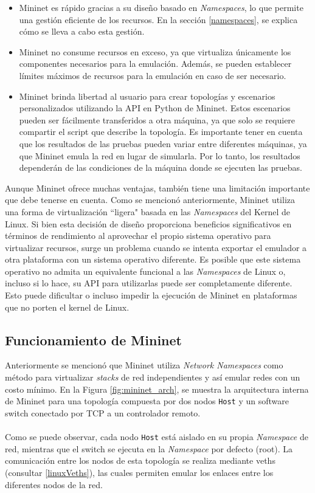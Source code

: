 \begin{itemize}
    \item Mininet es rápido gracias a su diseño basado en \textit{Namespaces}, lo que permite una gestión eficiente de los recursos. En la sección \ref{namespaces}, se explica cómo se lleva a cabo esta gestión.
    \item Mininet no consume recursos en exceso, ya que virtualiza únicamente los componentes necesarios para la emulación. Además, se pueden establecer límites máximos de recursos para la emulación en caso de ser necesario.
    \item Mininet brinda libertad al usuario para crear topologías y escenarios personalizados utilizando la API en Python de Mininet. Estos escenarios pueden ser fácilmente transferidos a otra máquina, ya que solo se requiere compartir el script que describe la topología. Es importante tener en cuenta que los resultados de las pruebas pueden variar entre diferentes máquinas, ya que Mininet emula la red en lugar de simularla. Por lo tanto, los resultados dependerán de las condiciones de la máquina donde se ejecuten las pruebas.
\end{itemize}

Aunque Mininet ofrece muchas ventajas, también tiene una limitación importante que debe tenerse en cuenta. Como se mencionó anteriormente, Mininet utiliza una forma de virtualización ``ligera" basada en las \textit{Namespaces} del Kernel de Linux. Si bien esta decisión de diseño proporciona beneficios significativos en términos de rendimiento al aprovechar el propio sistema operativo para virtualizar recursos, surge un problema cuando se intenta exportar el emulador a otra plataforma con un sistema operativo diferente. Es posible que este sistema operativo no admita un equivalente funcional a las \textit{Namespaces} de Linux o, incluso si lo hace, su API para utilizarlas puede ser completamente diferente. Esto puede dificultar o incluso impedir la ejecución de Mininet en plataformas que no porten el kernel de Linux.


\subsection{Funcionamiento de Mininet}

Anteriormente se mencionó que Mininet utiliza \textit{Network Namespaces} como método para virtualizar \textit{stacks} de red independientes y así emular redes con un costo mínimo. En la Figura \ref{fig:mininet_arch}, se muestra la arquitectura interna de Mininet para una topología compuesta por dos nodos \texttt{Host} y un software switch conectado por TCP a un controlador remoto.\\
\\
Como se puede observar, cada nodo \texttt{Host} está aislado en su propia \textit{Namespace} de red, mientras que el switch se ejecuta en la \textit{Namespace} por defecto (root). La comunicación entre los nodos de esta topología se realiza mediante \gls{veth}s (consultar \ref{linuxVeths}), las cuales permiten emular los enlaces entre los diferentes nodos de la red.\\

